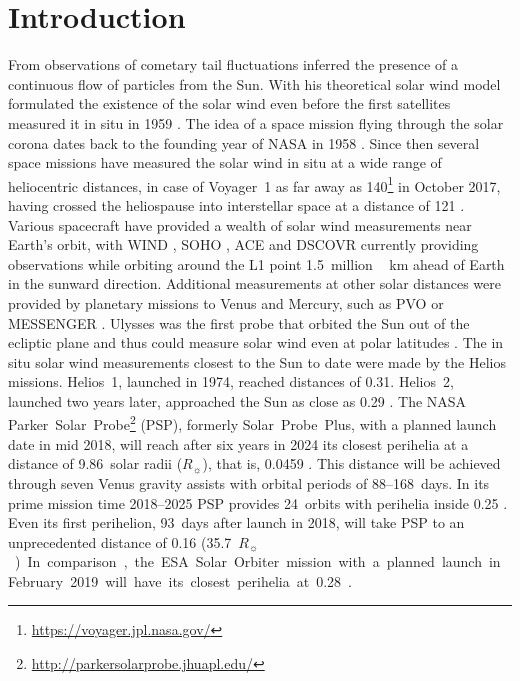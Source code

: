 \documentclass[]{aa}
\newcommand{\Rs}{$R_\sun{}$}
\begin{document}
	\section{Introduction}
	From observations of cometary tail fluctuations \citet{Biermann1951} inferred the presence of a continuous flow of particles from the Sun. With his theoretical solar wind model \citet{Parker1958} formulated the existence of the solar wind even before the first satellites measured it in situ in 1959 \citep{Gringauz1960,Neugebauer1966}.
	The idea of a space mission flying through the solar corona dates back to the founding year of NASA in 1958 \citep{McComas2008}. Since then several space missions have measured the solar wind in situ at a wide range of heliocentric distances, in case of Voyager~1 as far away as \SI{140}{\au}\footnote{\url{https://voyager.jpl.nasa.gov/}} in October 2017, having crossed the heliospause into interstellar space at a distance of \SI{121}{\au} \citep{Gurnett2013}.
	Various spacecraft have provided a wealth of solar wind measurements near Earth’s orbit, with WIND \citep{Lepping1995,Ogilvie1995}, SOHO \citep{Domingo1995}, ACE \citep{Stone1998} and DSCOVR \citep{Burt2012} currently providing observations while orbiting around the L1 point \SI{1.5}{million\,\km} ahead of Earth in the sunward direction. Additional measurements at other solar distances were provided by planetary missions to Venus and Mercury, such as PVO \citep{Colin1980} or MESSENGER \citep{Belcher1991}. Ulysses was the first probe that orbited the Sun out of the ecliptic plane and thus could measure solar wind even at polar latitudes \citep{McComas1998}. The in situ solar wind measurements closest to the Sun to date were made by the Helios missions. Helios~1, launched in 1974, reached distances of \SI{0.31}{\au}. Helios~2, launched two years later, approached the Sun as close as \SI{0.29}{\au} \citep{Rosenbauer1977}.
	The NASA Parker~Solar~Probe\footnote{\url{http://parkersolarprobe.jhuapl.edu/}} (PSP), formerly Solar~Probe~Plus, with a planned launch date in mid 2018, will reach after six years in 2024 its closest perihelia at a distance of 9.86~solar radii (\Rs), that is, \SI{0.0459}{\au} \citep{Fox2015}. This distance will be achieved through seven Venus gravity assists with orbital periods of 88--168~days. In its prime mission time 2018--2025 PSP provides 24~orbits with perihelia inside \SI{0.25}{\au} \citep{Fox2015}. Even its first perihelion, 93~days after launch in 2018, will take PSP to an unprecedented distance of \SI{0.16}{\au} (\SI{35.7}{\Rs}). In comparison, the ESA Solar Orbiter mission with a planned launch in February 2019 will have its closest perihelia at \SI{0.28}{\au} \citep{Muller2013}.
\end{document}
